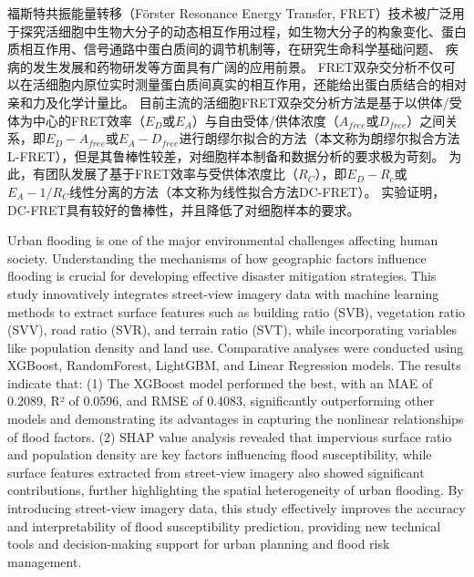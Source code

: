 \begin{cabstract}

\ifshowtext
福斯特共振能量转移（Förster Resonance Energy Transfer, FRET）技术被广泛用于探究活细胞中生物大分子的动态相互作用过程，如生物大分子的构象变化、蛋白质相互作用、信号通路中蛋白质间的调节机制等，在研究生命科学基础问题、 疾病的发生发展和药物研发等方面具有广阔的应用前景。
FRET双杂交分析不仅可以在活细胞内原位实时测量蛋白质间真实的相互作用，还能给出蛋白质结合的相对亲和力及化学计量比。
目前主流的活细胞FRET双杂交分析方法是基于以供体/受体为中心的FRET效率（$E_D$或$E_A$）与自由受体/供体浓度（$A_{free}$或$D_{free}$）之间关系，即${E_D-A_{free}}$或${E_A-D_{free}}$进行朗缪尔拟合的方法（本文称为朗缪尔拟合方法L-FRET），但是其鲁棒性较差，对细胞样本制备和数据分析的要求极为苛刻。
为此，有团队发展了基于FRET效率与受供体浓度比（$R_C$），即$E_D-R_c$或$E_A-1/R_C$线性分离的方法（本文称为线性拟合方法DC-FRET）。
实验证明，DC-FRET具有较好的鲁棒性，并且降低了对细胞样本的要求。
\fi

\end{cabstract}


\begin{eabstract}

\ifshowtext
Urban flooding is one of the major environmental challenges affecting human society. Understanding the mechanisms of how geographic factors influence flooding is crucial for developing effective disaster mitigation strategies. This study innovatively integrates street-view imagery data with machine learning methods to extract surface features such as building ratio (SVB), vegetation ratio (SVV), road ratio (SVR), and terrain ratio (SVT), while incorporating variables like population density and land use. Comparative analyses were conducted using XGBoost, RandomForest, LightGBM, and Linear Regression models. The results indicate that: (1) The XGBoost model performed the best, with an MAE of 0.2089, R² of 0.0596, and RMSE of 0.4083, significantly outperforming other models and demonstrating its advantages in capturing the nonlinear relationships of flood factors. (2) SHAP value analysis revealed that impervious surface ratio and population density are key factors influencing flood susceptibility, while surface features extracted from street-view imagery also showed significant contributions, further highlighting the spatial heterogeneity of urban flooding. By introducing street-view imagery data, this study effectively improves the accuracy and interpretability of flood susceptibility prediction, providing new technical tools and decision-making support for urban planning and flood risk management.
\fi
\end{eabstract}


